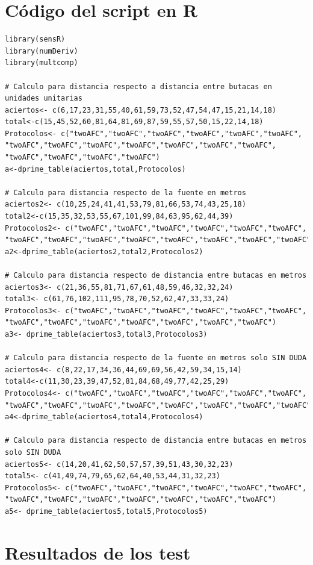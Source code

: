 \documentclass[11pt,a4paper]{book}
\begin{document}
\chapter{Código del script en R}
\begin{verbatim}
library(sensR)
library(numDeriv)
library(multcomp)

# Calculo para distancia respecto a distancia entre butacas en unidades unitarias
aciertos<- c(6,17,23,31,55,40,61,59,73,52,47,54,47,15,21,14,18)
total<-c(15,45,52,60,81,64,81,69,87,59,55,57,50,15,22,14,18)
Protocolos<- c("twoAFC","twoAFC","twoAFC","twoAFC","twoAFC","twoAFC",
"twoAFC","twoAFC","twoAFC","twoAFC","twoAFC","twoAFC","twoAFC",
"twoAFC","twoAFC","twoAFC","twoAFC")
a<-dprime_table(aciertos,total,Protocolos)

# Calculo para distancia respecto de la fuente en metros
aciertos2<- c(10,25,24,41,41,53,79,81,66,53,74,43,25,18)
total2<-c(15,35,32,53,55,67,101,99,84,63,95,62,44,39)
Protocolos2<- c("twoAFC","twoAFC","twoAFC","twoAFC","twoAFC","twoAFC",
"twoAFC","twoAFC","twoAFC","twoAFC","twoAFC","twoAFC","twoAFC","twoAFC")
a2<-dprime_table(aciertos2,total2,Protocolos2)

# Calculo para distancia respecto de distancia entre butacas en metros
aciertos3<- c(21,36,55,81,71,67,61,48,59,46,32,32,24)
total3<- c(61,76,102,111,95,78,70,52,62,47,33,33,24)
Protocolos3<- c("twoAFC","twoAFC","twoAFC","twoAFC","twoAFC","twoAFC",
"twoAFC","twoAFC","twoAFC","twoAFC","twoAFC","twoAFC","twoAFC")
a3<- dprime_table(aciertos3,total3,Protocolos3)

# Calculo para distancia respecto de la fuente en metros solo SIN DUDA
aciertos4<- c(8,22,17,34,36,44,69,69,56,42,59,34,15,14)
total4<-c(11,30,23,39,47,52,81,84,68,49,77,42,25,29)
Protocolos4<- c("twoAFC","twoAFC","twoAFC","twoAFC","twoAFC","twoAFC",
"twoAFC","twoAFC","twoAFC","twoAFC","twoAFC","twoAFC","twoAFC","twoAFC")
a4<-dprime_table(aciertos4,total4,Protocolos4)

# Calculo para distancia respecto de distancia entre butacas en metros solo SIN DUDA
aciertos5<- c(14,20,41,62,50,57,57,39,51,43,30,32,23)
total5<- c(41,49,74,79,65,62,64,40,53,44,31,32,23)
Protocolos5<- c("twoAFC","twoAFC","twoAFC","twoAFC","twoAFC","twoAFC",
"twoAFC","twoAFC","twoAFC","twoAFC","twoAFC","twoAFC","twoAFC")
a5<- dprime_table(aciertos5,total5,Protocolos5)

\end{verbatim}

\chapter{Resultados de los test}
\end{document}
